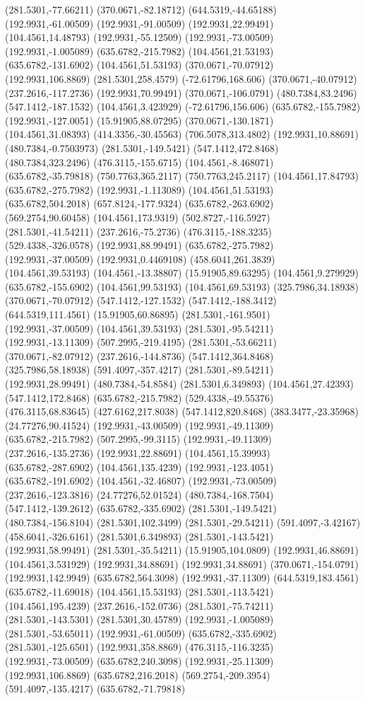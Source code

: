 \documentclass[12pt,letterpaper]{article}
\begin{document}
(281.5301,-77.66211) (370.0671,-82.18712) (644.5319,-44.65188) (192.9931,-61.00509) (192.9931,-91.00509) (192.9931,22.99491) (104.4561,14.48793) (192.9931,-55.12509) (192.9931,-73.00509) (192.9931,-1.005089) (635.6782,-215.7982) (104.4561,21.53193) (635.6782,-131.6902) (104.4561,51.53193) (370.0671,-70.07912) (192.9931,106.8869) (281.5301,258.4579) (-72.61796,168.606) (370.0671,-40.07912) (237.2616,-117.2736) (192.9931,70.99491) (370.0671,-106.0791) (480.7384,83.2496) (547.1412,-187.1532) (104.4561,3.423929) (-72.61796,156.606) (635.6782,-155.7982) (192.9931,-127.0051) (15.91905,88.07295) (370.0671,-130.1871) (104.4561,31.08393) (414.3356,-30.45563) (706.5078,313.4802) (192.9931,10.88691) (480.7384,-0.7503973) (281.5301,-149.5421) (547.1412,472.8468) (480.7384,323.2496) (476.3115,-155.6715) (104.4561,-8.468071) (635.6782,-35.79818) (750.7763,365.2117) (750.7763,245.2117) (104.4561,17.84793) (635.6782,-275.7982) (192.9931,-1.113089) (104.4561,51.53193) (635.6782,504.2018) (657.8124,-177.9324) (635.6782,-263.6902) (569.2754,90.60458) (104.4561,173.9319) (502.8727,-116.5927) (281.5301,-41.54211) (237.2616,-75.2736) (476.3115,-188.3235) (529.4338,-326.0578) (192.9931,88.99491) (635.6782,-275.7982) (192.9931,-37.00509) (192.9931,0.4469108) (458.6041,261.3839) (104.4561,39.53193) (104.4561,-13.38807) (15.91905,89.63295) (104.4561,9.279929) (635.6782,-155.6902) (104.4561,99.53193) (104.4561,69.53193) (325.7986,34.18938) (370.0671,-70.07912) (547.1412,-127.1532) (547.1412,-188.3412) (644.5319,111.4561) (15.91905,60.86895) (281.5301,-161.9501) (192.9931,-37.00509) (104.4561,39.53193) (281.5301,-95.54211) (192.9931,-13.11309) (507.2995,-219.4195) (281.5301,-53.66211) (370.0671,-82.07912) (237.2616,-144.8736) (547.1412,364.8468) (325.7986,58.18938) (591.4097,-357.4217) (281.5301,-89.54211) (192.9931,28.99491) (480.7384,-54.8584) (281.5301,6.349893) (104.4561,27.42393) (547.1412,172.8468) (635.6782,-215.7982) (529.4338,-49.55376) (476.3115,68.83645) (427.6162,217.8038) (547.1412,820.8468) (383.3477,-23.35968) (24.77276,90.41524) (192.9931,-43.00509) (192.9931,-49.11309) (635.6782,-215.7982) (507.2995,-99.3115) (192.9931,-49.11309) (237.2616,-135.2736) (192.9931,22.88691) (104.4561,15.39993) (635.6782,-287.6902) (104.4561,135.4239) (192.9931,-123.4051) (635.6782,-191.6902) (104.4561,-32.46807) (192.9931,-73.00509) (237.2616,-123.3816) (24.77276,52.01524) (480.7384,-168.7504) (547.1412,-139.2612) (635.6782,-335.6902) (281.5301,-149.5421) (480.7384,-156.8104) (281.5301,102.3499) (281.5301,-29.54211) (591.4097,-3.42167) (458.6041,-326.6161) (281.5301,6.349893) (281.5301,-143.5421) (192.9931,58.99491) (281.5301,-35.54211) (15.91905,104.0809) (192.9931,46.88691) (104.4561,3.531929) (192.9931,34.88691) (192.9931,34.88691) (370.0671,-154.0791) (192.9931,142.9949) (635.6782,564.3098) (192.9931,-37.11309) (644.5319,183.4561) (635.6782,-11.69018) (104.4561,15.53193) (281.5301,-113.5421) (104.4561,195.4239) (237.2616,-152.0736) (281.5301,-75.74211) (281.5301,-143.5301) (281.5301,30.45789) (192.9931,-1.005089) (281.5301,-53.65011) (192.9931,-61.00509) (635.6782,-335.6902) (281.5301,-125.6501) (192.9931,358.8869) (476.3115,-116.3235) (192.9931,-73.00509) (635.6782,240.3098) (192.9931,-25.11309) (192.9931,106.8869) (635.6782,216.2018) (569.2754,-209.3954) (591.4097,-135.4217) (635.6782,-71.79818) 
\end{document}
